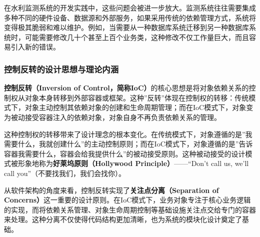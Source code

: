 在水利监测系统的开发实践中，这些问题会被进一步放大。监测系统往往需要集成多种不同的硬件设备、数据源和外部服务，如果采用传统的依赖管理方式，系统将变得极其脆弱和难以维护。例如，当需要从一种数据库系统迁移到另一种数据库系统时，可能需要修改几十个甚至上百个业务类，这种修改不仅工作量巨大，而且容易引入新的错误。

\subsubsection{控制反转的设计思想与理论内涵}\label{ux63a7ux5236ux53cdux8f6cux7684ux8bbeux8ba1ux601dux60f3ux4e0eux7406ux8bbaux5185ux6db5}

\textbf{控制反转（Inversion of Control，简称IoC）}的核心思想是将对象依赖关系的控制权从对象本身转移到外部容器或框架。这种''反转''体现在控制权的转移：传统模式下，对象主动控制其依赖对象的创建和生命周期管理；而在IoC模式下，对象变为被动接受容器注入的依赖对象，对象自身不再负责依赖关系的管理。

这种控制权的转移带来了设计理念的根本变化。在传统模式下，对象遵循的是''我需要什么，我就创建什么''的主动控制原则；而在IoC模式下，对象遵循的是''告诉容器我需要什么，容器会给我提供什么''的被动接受原则。这种被动接受的设计模式被形象地称为\textbf{好莱坞原则（Hollywood Principle）}------``Don't call us, we'll call you''（不要找我们，我们会找你）。

从软件架构的角度来看，控制反转实现了\textbf{关注点分离（Separation of Concerns）}这一重要的设计原则。在IoC模式下，业务对象专注于核心业务逻辑的实现，而将依赖关系管理、对象生命周期控制等基础设施关注点交给专门的容器来处理。这种分离不仅使得代码结构更加清晰，也为系统的模块化设计奠定了基础。

